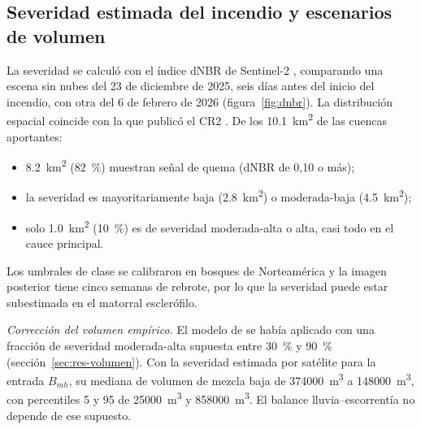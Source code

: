 \subsection{Severidad estimada del incendio y escenarios de volumen}\label{sec:res-incendio}
La severidad se calculó con el índice dNBR de Sentinel-2 \citep{keybenson2006}, comparando una escena sin nubes del 23 de diciembre de 2025, seis días antes del inicio del incendio, con otra del 6 de febrero de 2026 (figura~\ref{fig:dnbr}). La distribución espacial coincide con la que publicó el CR2 \citep{cr2_2026}. De los \SI{10,1}{km^2} de las cuencas aportantes:
\begin{itemize}
\item \SI{8,2}{km^2} (\SI{82}{\percent}) muestran señal de quema (dNBR de 0,10 o más);
\item la severidad es mayoritariamente baja (\SI{2,8}{km^2}) o moderada-baja (\SI{4,5}{km^2});
\item solo \SI{1,0}{km^2} (\SI{10}{\percent}) es de severidad moderada-alta o alta, casi todo en el cauce principal.
\end{itemize}
Los umbrales de clase se calibraron en bosques de Norteamérica y la imagen posterior tiene cinco semanas de rebrote, por lo que la severidad puede estar subestimada en el matorral esclerófilo.

\emph{Corrección del volumen empírico.} El modelo de \citet{gartner2014} se había aplicado con una fracción de severidad moderada-alta supuesta entre \SI{30}{\percent} y \SI{90}{\percent} (sección~\ref{sec:res-volumen}). Con la severidad estimada por satélite para la entrada $B_{mh}$, su mediana de volumen de mezcla baja de \SI{374000}{m^3} a \SI{148000}{m^3}, con percentiles 5 y 95 de \SI{25000}{m^3} y \SI{858000}{m^3}. El balance lluvia--escorrentía no depende de ese supuesto.

